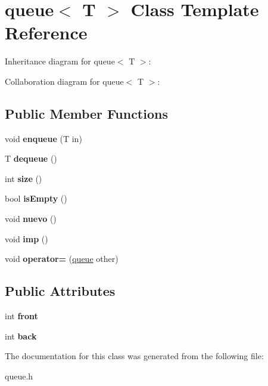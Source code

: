 \hypertarget{classqueue}{}\section{queue$<$ T $>$ Class Template Reference}
\label{classqueue}


Inheritance diagram for queue$<$ T $>$\+:


Collaboration diagram for queue$<$ T $>$\+:
\subsection*{Public Member Functions}
\begin{DoxyCompactItemize}
\item 
void {\bfseries enqueue} (T in)\hypertarget{classqueue_a9abe675f4fc6ecbc878780508fa0f4d7}{}\label{classqueue_a9abe675f4fc6ecbc878780508fa0f4d7}

\item 
T {\bfseries dequeue} ()\hypertarget{classqueue_ab9f67346069105686326aba9069b767e}{}\label{classqueue_ab9f67346069105686326aba9069b767e}

\item 
int {\bfseries size} ()\hypertarget{classqueue_a5ac258cdc179dffb6646ebf3c66ec0d3}{}\label{classqueue_a5ac258cdc179dffb6646ebf3c66ec0d3}

\item 
bool {\bfseries is\+Empty} ()\hypertarget{classqueue_a00023ff2feb5b037a2c941a4c82b044a}{}\label{classqueue_a00023ff2feb5b037a2c941a4c82b044a}

\item 
void {\bfseries nuevo} ()\hypertarget{classqueue_aea1e169898867d72b109d3498f09e438}{}\label{classqueue_aea1e169898867d72b109d3498f09e438}

\item 
void {\bfseries imp} ()\hypertarget{classqueue_a3524c4ecbf22a9a44d108c04144cee25}{}\label{classqueue_a3524c4ecbf22a9a44d108c04144cee25}

\item 
void {\bfseries operator=} (\hyperlink{classqueue}{queue} other)\hypertarget{classqueue_a9c5513370b6d868effe047d037ad3b64}{}\label{classqueue_a9c5513370b6d868effe047d037ad3b64}

\end{DoxyCompactItemize}
\subsection*{Public Attributes}
\begin{DoxyCompactItemize}
\item 
int {\bfseries front}\hypertarget{classqueue_abd6268eb1b52af6c4763259a9cdb907d}{}\label{classqueue_abd6268eb1b52af6c4763259a9cdb907d}

\item 
int {\bfseries back}\hypertarget{classqueue_a29f8622831381599ebc20354f5cc55ef}{}\label{classqueue_a29f8622831381599ebc20354f5cc55ef}

\end{DoxyCompactItemize}


The documentation for this class was generated from the following file\+:\begin{DoxyCompactItemize}
\item 
queue.\+h\end{DoxyCompactItemize}
